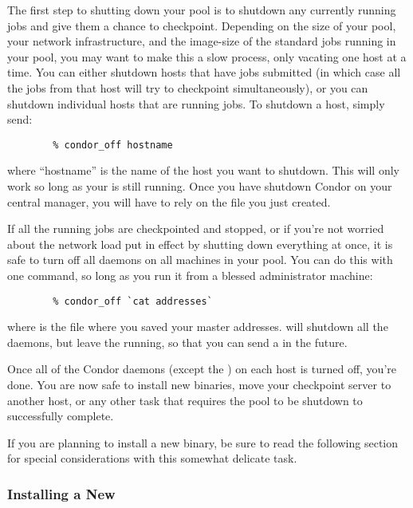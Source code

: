 The first step to shutting down your pool is to shutdown any currently
running jobs and give them a chance to checkpoint.
Depending on the size of your pool, your network infrastructure, and
the image-size of the standard jobs running in your pool, you may want
to make this a slow process, only vacating one host at a time.
You can either shutdown hosts that have jobs submitted (in which case
all the jobs from that host will try to checkpoint simultaneously), or
you can shutdown individual hosts that are running jobs.
To shutdown a host, simply send:
\begin{verbatim}
        % condor_off hostname
\end{verbatim}
where ``hostname'' is the name of the host you want to shutdown.
This will only work so long as your  is still
running.
Once you have shutdown Condor on your central manager, you will have
to rely on the  file you just created.

If all the running jobs are checkpointed and stopped, or if you're not
worried about the network load put in effect by shutting down
everything at once, it is safe to turn off all daemons on all machines
in your pool.
You can do this with one command, so long as you run it from a blessed
administrator machine:
\begin{verbatim}
        % condor_off `cat addresses`
\end{verbatim}
where  is the file where you saved your master
addresses. 
 will shutdown all the daemons, but leave the
 running, so that you can send a  in the
future.  

Once all of the Condor daemons (except the ) on each
host is turned off, you're done.
You are now safe to install new binaries, move your checkpoint server
to another host, or any other task that requires the pool to be
shutdown to successfully complete.

\Note If you are planning to install a new  binary, be
sure to read the following section for special considerations with
this somewhat delicate task.

\subsubsection{\label{sec:New-Master}Installing a New }


